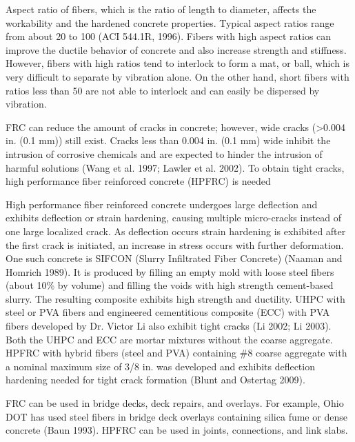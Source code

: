 Aspect ratio of fibers, which is the ratio of length to diameter, affects the workability and the hardened concrete properties. Typical aspect ratios range from about 20 to 100 (ACI 544.1R, 1996). Fibers with high aspect ratios can improve the ductile behavior of concrete and also increase strength and stiffness. However, fibers with high ratios tend to interlock to form a mat, or ball, which is very difficult to separate by vibration alone. On the other hand, short fibers with ratios less than 50 are not able to interlock and can easily be dispersed by vibration.

FRC can reduce the amount of cracks in concrete; however, wide cracks (>0.004 in. (0.1 mm)) still exist. Cracks less than 0.004 in. (0.1 mm) wide inhibit the intrusion of corrosive chemicals and are expected to hinder the intrusion of harmful solutions (Wang et al. 1997; Lawler et al. 2002). To obtain tight cracks, high performance fiber reinforced concrete (HPFRC) is needed

High performance fiber reinforced concrete undergoes large deflection and exhibits deflection or strain hardening, causing multiple micro-cracks instead of one large localized crack. As deflection occurs strain hardening is exhibited after the first crack is initiated, an increase in stress occurs with further deformation. One such concrete is SIFCON (Slurry Infiltrated Fiber Concrete) (Naaman and Homrich 1989). It is produced by filling an empty mold with loose steel fibers (about 10\% by volume) and filling the voids with high strength cement-based slurry. The resulting composite exhibits high strength and ductility. UHPC with steel or PVA fibers and engineered cementitious composite (ECC) with PVA fibers developed by Dr. Victor Li also exhibit tight cracks (Li 2002; Li 2003). Both the UHPC and ECC are mortar mixtures without the coarse aggregate. HPFRC with hybrid fibers (steel and PVA) containing \#8 coarse aggregate with a nominal maximum size of 3/8 in. was developed and exhibits deflection hardening needed for tight crack formation (Blunt and Ostertag 2009).

FRC can be used in bridge decks, deck repairs, and overlays. For example, Ohio DOT has used steel fibers in bridge deck overlays containing silica fume or dense concrete (Baun 1993). HPFRC can be used in joints, connections, and link slabs.

